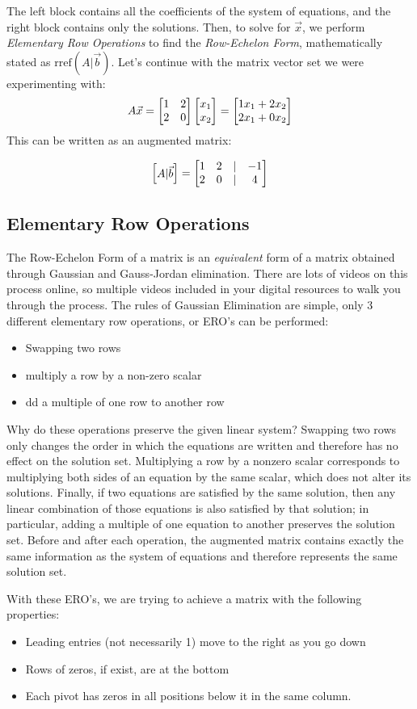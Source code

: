 The left block contains all the coefficients of the system of equations, and the right block contains only the solutions. Then, to solve for $\vec{x}$, we perform \textit{Elementary Row Operations} to find the \textit{Row-Echelon Form}, mathematically stated as $\text{rref}(A\vert \vec{b})$. Let's continue with the matrix vector set we were experimenting with:
$$A\vec{x} = \begin{bmatrix} 1 & 2 \\ 2 & 0 \end{bmatrix}\begin{bmatrix} x_1 \\ x_2 \end{bmatrix} = \begin{bmatrix} 1x_1 + 2x_2 \\ 2x_1 + 0x_2 \end{bmatrix}$$
This can be written as an augmented matrix:

$$\begin{bmatrix} A\vert \vec{b} \end{bmatrix} = \begin{bmatrix} 1 & 2 &\vert & -1 \\ 2 & 0 & \vert & 4 \end{bmatrix}$$


\subsection{Elementary Row Operations}
The Row-Echelon Form of a matrix is an \emph{equivalent} form of a matrix obtained through Gaussian and Gauss-Jordan elimination. There are lots of videos on this process online, so multiple videos included in your digital resources to walk you through the process. The rules of Gaussian Elimination are simple, only 3 different elementary row operations, or ERO's can be performed:

\begin{itemize}
       \item Swapping two rows
       \item multiply a row by a non-zero scalar
       \item dd a multiple of one row to another row
\end{itemize}
Why do these operations preserve the given linear system? Swapping two rows only changes the order in which the equations are written and therefore has no effect on the solution set. Multiplying a row by a nonzero scalar corresponds to multiplying both sides of an equation by the same scalar, which does not alter its solutions. Finally, if two equations are satisfied by the same solution, then any linear combination of those equations is also satisfied by that solution; in particular, adding a multiple of one equation to another preserves the solution set. Before and after each operation, the augmented matrix contains exactly the same information as the system of equations and therefore represents the same solution set.

With these ERO's, we are trying to achieve a matrix with the following properties:
\begin{itemize}
\item Leading entries (not necessarily 1) move to the right as you go down
\item Rows of zeros, if exist, are at the bottom
\item Each pivot has zeros in all positions below it in the same column.
\end{itemize}

